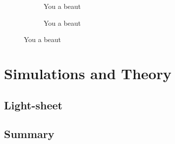 \begin{figure}
\centering
\begin{subfigure}[b]{0.4\textwidth}
  
  \caption{You a beaut}
  \end{subfigure}%
\begin{subfigure}[b]{0.4\textwidth}
    \centering
  
  \caption{You a beaut}
  \end{subfigure}%
\end{figure}

\section{Simulations and Theory}
\subsection{Light-sheet}

\subsection{Summary}
